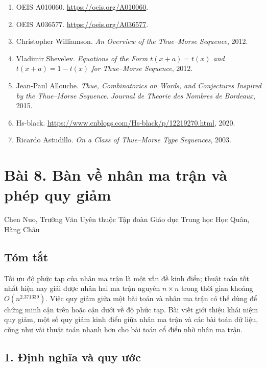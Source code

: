 \documentclass[11pt]{article}
\begin{document}
\begin{enumerate}
  \item OEIS A010060. \url{https://oeis.org/A010060}.
  \item OEIS A036577. \url{https://oeis.org/A036577}.
  \item Christopher Williamson. \emph{An Overview of the Thue--Morse
  Sequence}, 2012.
  \item Vladimir Shevelev. \emph{Equations of the Form \(t(x+a)=t(x)\) and
  \(t(x+a)=1-t(x)\) for Thue--Morse Sequence}, 2012.
  \item Jean-Paul Allouche. \emph{Thue, Combinatorics on Words, and Conjectures
  Inspired by the Thue--Morse Sequence}. \emph{Journal de Theorie des Nombres
  de Bordeaux}, 2015.
  \item Hs-black. \url{https://www.cnblogs.com/Hs-black/p/12219270.html},
  2020.
  \item Ricardo Astudillo. \emph{On a Class of Thue--Morse Type Sequences},
  2003.
\end{enumerate}

\section*{Bài 8. Bàn về nhân ma trận và phép quy giảm}

\begin{center}
Chen Nuo, Trường Văn Uyên thuộc Tập đoàn Giáo dục Trung học Học Quân, Hàng Châu
\end{center}

\subsection*{Tóm tắt}

Tối ưu độ phức tạp của nhân ma trận là một vấn đề kinh điển; thuật toán tốt
nhất hiện nay giải được nhân hai ma trận nguyên \(n\times n\) trong thời gian
khoảng \(O(n^{2.371339})\). Việc quy giảm giữa một bài toán và nhân ma trận có
thể dùng để chứng minh cận trên hoặc cận dưới về độ phức tạp. Bài viết giới
thiệu khái niệm quy giảm, một số quy giảm kinh điển giữa nhân ma trận và các
bài toán dữ liệu, cũng như vài thuật toán nhanh hơn cho bài toán cổ điển nhờ
nhân ma trận.

\subsection*{1. Định nghĩa và quy ước}
\end{document}
